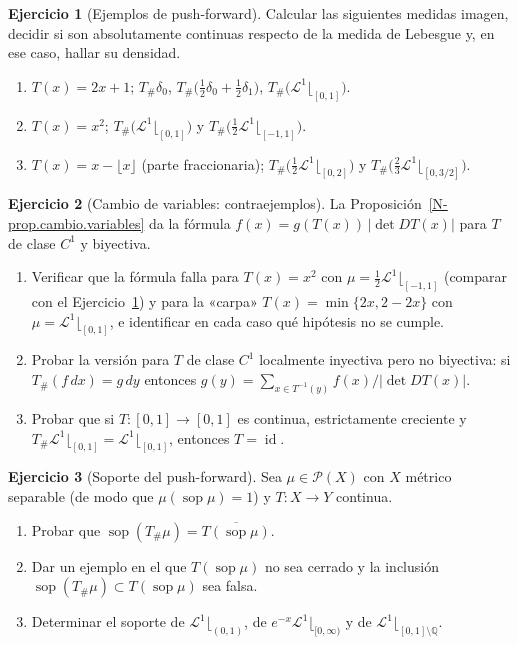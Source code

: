 \documentclass[11pt,a4paper]{amsart}
\newcounter{chapter}
\newcommand{\id}{\operatorname{id}}
\def\sop{\operatorname {\mathrm{sop}}}
\newcommand{\Q}{{\mathbb Q}}
\newcommand{\LL}{{\mathcal L}}
\theoremstyle{remark}
\theoremstyle{definition}
\newtheorem{ejercicio}{Ejercicio}[chapter]
\numberwithin{subsection}{section}
\numberwithin{equation}{section}
\begin{document}
\begin{ejercicio}[Ejemplos de push-forward]\label{ejer.pushforward.ejemplos}
Calcular las siguientes medidas imagen, decidir si son absolutamente
continuas respecto de la medida de Lebesgue y, en ese caso, hallar su densidad.
\begin{enumerate}[label=(\alph*)]
\item $T(x)=2x+1$; $T_\#\delta_0$, $T_\#\bigl(\tfrac12\delta_0+\tfrac12\delta_1\bigr)$,
$T_\#\bigl(\LL^1\lfloor_{[0,1]}\bigr)$.
\item $T(x)=x^2$; $T_\#\bigl(\LL^1\lfloor_{[0,1]}\bigr)$ y
$T_\#\bigl(\tfrac12\LL^1\lfloor_{[-1,1]}\bigr)$.
\item $T(x)=x-\lfloor x\rfloor$ (parte fraccionaria); $T_\#\bigl(\tfrac12\LL^1\lfloor_{[0,2]}\bigr)$
y $T_\#\bigl(\tfrac23\LL^1\lfloor_{[0,3/2]}\bigr)$.
\end{enumerate}
\end{ejercicio}

\begin{ejercicio}[Cambio de variables: contraejemplos]\label{ejer.cambio.variables}
La Proposición~\ref{N-prop.cambio.variables} da la fórmula
$f(x)=g(T(x))\,|\det DT(x)|$ para $T$ de clase $C^1$ y biyectiva.
\begin{enumerate}[label=(\alph*)]
\item Verificar que la fórmula falla para $T(x)=x^2$ con
$\mu=\frac12\LL^1\lfloor_{[-1,1]}$ (comparar con el
Ejercicio~\ref{ejer.pushforward.ejemplos}) y para la «carpa»
$T(x)=\min\{2x,2-2x\}$ con $\mu=\LL^1\lfloor_{[0,1]}$, e identificar en cada
caso qué hipótesis no se cumple.
\item Probar la versión para $T$ de clase $C^1$ localmente inyectiva pero
no biyectiva: si $T_\#(f\,dx)=g\,dy$ entonces
$g(y)=\sum_{x\in T^{-1}(y)}f(x)/|\det DT(x)|$.
\item Probar que si $T\colon[0,1]\to[0,1]$ es continua, estrictamente
creciente y $T_\#\LL^1\lfloor_{[0,1]}=\LL^1\lfloor_{[0,1]}$, entonces $T=\id$.
\end{enumerate}
\end{ejercicio}

\begin{ejercicio}[Soporte del push-forward]\label{ejer.soporte.pushforward}
Sea $\mu\in\mathcal P(X)$ con $X$ métrico separable (de modo que
$\mu(\sop\mu)=1$) y $T\colon X\to Y$ continua.
\begin{enumerate}[label=(\alph*)]
\item Probar que $\sop(T_\#\mu)=\overline{T(\sop\mu)}$.
\item Dar un ejemplo en el que $T(\sop\mu)$ no sea cerrado y la inclusión
$\sop(T_\#\mu)\subset T(\sop\mu)$ sea falsa.
\item Determinar el soporte de $\LL^1\lfloor_{(0,1)}$, de
$e^{-x}\LL^1\lfloor_{[0,\infty)}$ y de $\LL^1\lfloor_{[0,1]\setminus\Q}$.
\end{enumerate}
\end{ejercicio}
\end{document}
